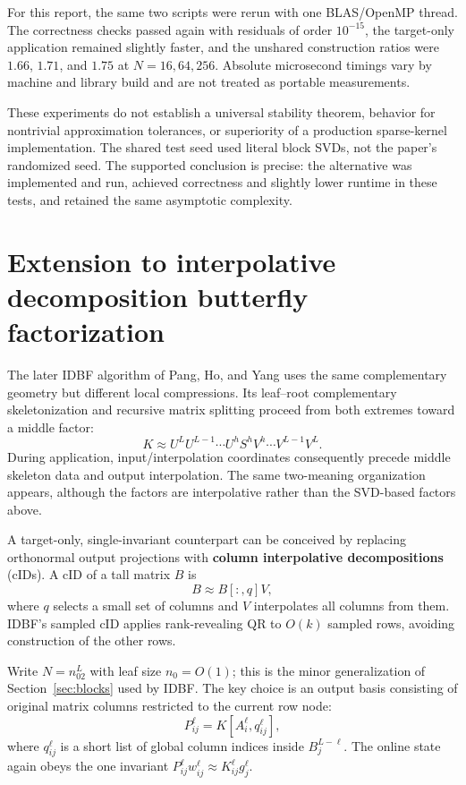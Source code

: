 \documentclass[11pt]{article}
\begin{document}
For this report, the same two scripts were rerun with one BLAS/OpenMP thread.  The correctness checks passed again with residuals of order $10^{-15}$, the target-only application remained slightly faster, and the unshared construction ratios were $1.66$, $1.71$, and $1.75$ at $N=16,64,256$.  Absolute microsecond timings vary by machine and library build and are not treated as portable measurements.

These experiments do not establish a universal stability theorem, behavior for nontrivial approximation tolerances, or superiority of a production sparse-kernel implementation.  The shared test seed used literal block SVDs, not the paper's randomized seed.  The supported conclusion is precise: the alternative was implemented and run, achieved correctness and slightly lower runtime in these tests, and retained the same asymptotic complexity.

\section{Extension to interpolative decomposition butterfly factorization}
\label{sec:idbf}

The later IDBF algorithm of Pang, Ho, and Yang \cite{IDBF} uses the same complementary geometry but different local compressions.  Its leaf--root complementary skeletonization and recursive matrix splitting proceed from both extremes toward a middle factor:
\[
 K\approx U^LU^{L-1}\cdots U^hS^hV^h\cdots V^{L-1}V^L .
\]
During application, input/interpolation coordinates consequently precede middle skeleton data and output interpolation.  The same two-meaning organization appears, although the factors are interpolative rather than the SVD-based factors above.

A target-only, single-invariant counterpart can be conceived by replacing orthonormal output projections with \textbf{column interpolative decompositions} (cIDs).  A cID of a tall matrix $B$ is
\[
 B\approx B[:,q]V,
 \tag{20}\label{eq:cid}
\]
where $q$ selects a small set of columns and $V$ interpolates all columns from them.  IDBF's sampled cID applies rank-revealing QR to $O(k)$ sampled rows, avoiding construction of the other rows.

Write $N=n_02^L$ with leaf size $n_0=O(1)$; this is the minor generalization of Section~\ref{sec:blocks} used by IDBF.  The key choice is an output basis consisting of original matrix columns restricted to the current row node:
\[
 P_{ij}^{\ell}=K[A_i^\ell,q_{ij}^{\ell}],
 \tag{21}\label{eq:id-basis}
\]
where $q_{ij}^{\ell}$ is a short list of global column indices inside $B_j^{L-\ell}$.  The online state again obeys the one invariant $P_{ij}^{\ell}w_{ij}^{\ell}\approx K_{ij}^{\ell}g_j^{\ell}$.
\end{document}
